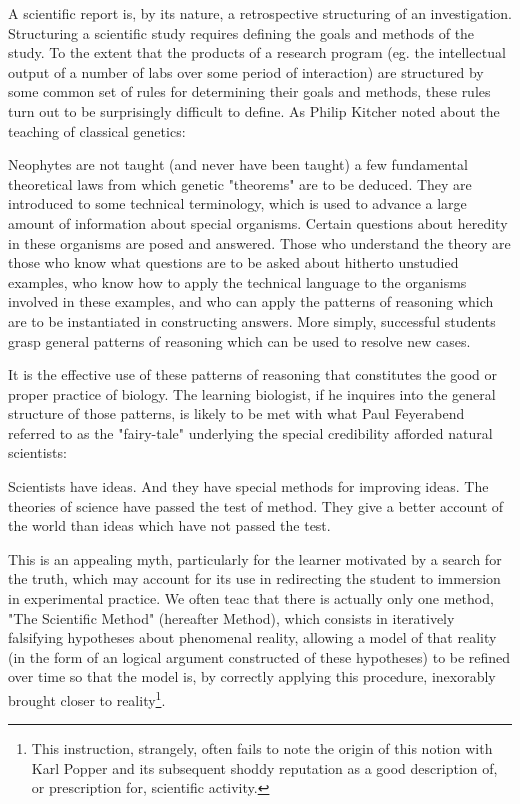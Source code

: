 A scientific report is, by its nature, a retrospective structuring of an investigation. Structuring a scientific study requires defining the goals and methods of the study. To the extent that the products of a research program (eg. the intellectual output of a number of labs over some period of interaction) are structured by some common set of rules for determining their goals and methods, these rules turn out to be surprisingly difficult to define. As Philip Kitcher noted about the teaching of classical genetics:

\begin{longquote}

Neophytes are not taught (and never have been taught) a few fundamental theoretical laws from which genetic "theorems" are to be deduced. They are introduced to some technical terminology, which is used to advance a large amount of information about special organisms. Certain questions about heredity in these organisms are posed and answered. Those who understand the theory are those who know what questions are to be asked about hitherto unstudied examples, who know how to apply the technical language to the organisms involved in these examples, and
who can apply the patterns of reasoning which are to be instantiated in constructing answers. More simply, successful students grasp general patterns of reasoning which can be used to resolve new cases. \cite{Kitcher1984}

\end{longquote}

It is the effective use of these patterns of reasoning that constitutes the good or proper practice of biology. The learning biologist, if he inquires into the general structure of those patterns, is likely to be met with what Paul Feyerabend referred to as the "fairy-tale" underlying the special credibility afforded natural scientists:

\begin{longquote}

Scientists have ideas. And they have special methods for improving ideas. The theories of science have passed the test of method. They give a better account of the world than ideas which have not passed the test. \cite{Feyerabend1993}

\end{longquote}

This is an appealing myth, particularly for the learner motivated by a search for the truth, which may account for its use in redirecting the student to immersion in experimental practice. We often teac that there is actually only one method, "The Scientific Method" (hereafter Method), which consists in iteratively falsifying hypotheses about phenomenal reality, allowing a model of that reality (in the form of an logical argument constructed of these hypotheses) to be refined over time so that the model is, by correctly applying this procedure, inexorably brought closer to reality\footnote{This instruction, strangely, often fails to note the origin of this notion with Karl Popper and its subsequent shoddy reputation as a good description of, or prescription for, scientific activity.}.

